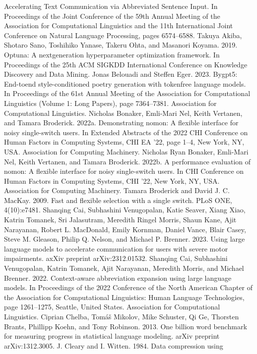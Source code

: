 Accelerating Text Communication via Abbreviated
Sentence Input. In Proceedings of the Joint Conference of the 59th Annual Meeting of the Association
for Computational Linguistics and the 11th International Joint Conference on Natural Language Processing, pages 6574–6588.
Takuya Akiba, Shotaro Sano, Toshihiko Yanase, Takeru
Ohta, and Masanori Koyama. 2019. Optuna: A nextgeneration hyperparameter optimization framework.
In Proceedings of the 25th ACM SIGKDD International Conference on Knowledge Discovery and Data
Mining.
Jonas Belouadi and Steffen Eger. 2023. Bygpt5: End-toend style-conditioned poetry generation with tokenfree language models. In Proceedings of the 61st
Annual Meeting of the Association for Computational Linguistics (Volume 1: Long Papers), page
7364–7381. Association for Computational Linguistics.
Nicholas Bonaker, Emli-Mari Nel, Keith Vertanen, and
Tamara Broderick. 2022a. Demonstrating nomon: A
flexible interface for noisy single-switch users. In
Extended Abstracts of the 2022 CHI Conference on
Human Factors in Computing Systems, CHI EA ’22,
page 1–4, New York, NY, USA. Association for Computing Machinery.
Nicholas Ryan Bonaker, Emli-Mari Nel, Keith Vertanen, and Tamara Broderick. 2022b. A performance
evaluation of nomon: A flexible interface for noisy
single-switch users. In CHI Conference on Human
Factors in Computing Systems, CHI ’22, New York,
NY, USA. Association for Computing Machinery.
Tamara Broderick and David J. C. MacKay. 2009. Fast
and flexible selection with a single switch. PLoS
ONE, 4(10):e7481.
Shanqing Cai, Subhashini Venugopalan, Katie Seaver,
Xiang Xiao, Katrin Tomanek, Sri Jalasutram, Meredith Ringel Morris, Shaun Kane, Ajit Narayanan,
Robert L. MacDonald, Emily Kornman, Daniel
Vance, Blair Casey, Steve M. Gleason, Philip Q. Nelson, and Michael P. Brenner. 2023. Using large
language models to accelerate communication for
users with severe motor impairments. axXiv preprint
arXiv:2312.01532.
Shanqing Cai, Subhashini Venugopalan, Katrin
Tomanek, Ajit Narayanan, Meredith Morris, and
Michael Brenner. 2022. Context-aware abbreviation expansion using large language models. In Proceedings of the 2022 Conference of the North American Chapter of the Association for Computational
Linguistics: Human Language Technologies, page
1261–1275, Seattle, United States. Association for
Computational Linguistics.
Ciprian Chelba, Tomáš Mikolov, Mike Schuster, Qi Ge,
Thorsten Brants, Phillipp Koehn, and Tony Robinson. 2013. One billion word benchmark for measuring progress in statistical language modeling. arXiv
preprint arXiv:1312.3005.
J. Cleary and I. Witten. 1984. Data compression using
